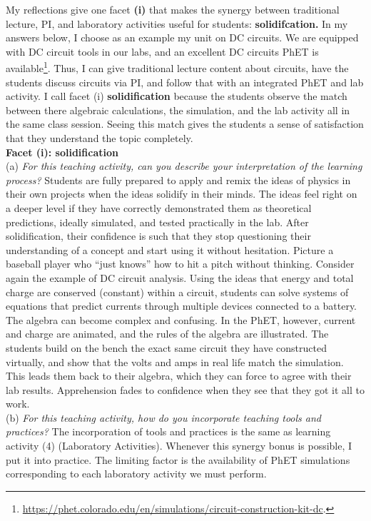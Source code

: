 \documentclass[../../../main.tex]{subfiles}
\begin{document}
My reflections give one facet \textbf{(i)} that makes the synergy between traditional lecture, PI, and laboratory activities useful for students: \textbf{solidifcation.}  In my answers below, I choose as an example my unit on DC circuits.  We are equipped with DC circuit tools in our labs, and an excellent DC circuits PhET is available\footnote{\url{https://phet.colorado.edu/en/simulations/circuit-construction-kit-dc}.}.  Thus, I can give traditional lecture content about circuits, have the students discuss circuits via PI, and follow that with an integrated PhET and lab activity.  I call facet (i) \textbf{solidification} because the students observe the match between there algebraic calculations, the simulation, and the lab activity all in the same class session.  Seeing this match gives the students a sense of satisfaction that they understand the topic completely.
\\
\vspace{0.25cm}
\textbf{Facet (i): solidification}
\\
\vspace{0.25cm}
(a) \textit{For this teaching activity, can you describe your interpretation of the learning process?}  Students are fully prepared to apply and remix the ideas of physics in their own projects when the ideas solidify in their minds.  The ideas feel right on a deeper level if they have correctly demonstrated them as theoretical predictions, ideally simulated, and tested practically in the lab.  After solidification, their confidence is such that they stop questioning their understanding of a concept and start using it without hesitation.  Picture a baseball player who ``just knows'' how to hit a pitch without thinking.  Consider again the example of DC circuit analysis.  Using the ideas that energy and total charge are conserved (constant) within a circuit, students can solve systems of equations that predict currents through multiple devices connected to a battery.  The algebra can become complex and confusing.  In the PhET, however, current and charge are animated, and the rules of the algebra are illustrated.  The students build on the bench the exact same circuit they have constructed virtually, and show that the volts and amps in real life match the simulation.  This leads them back to their algebra, which they can force to agree with their lab results.  Apprehension fades to confidence when they see that they got it all to work.
\\
\vspace{0.25cm}
(b) \textit{For this teaching activity, how do you incorporate teaching tools and practices?}  The incorporation of tools and practices is the same as learning activity (4) (Laboratory Activities).  Whenever this synergy bonus is possible, I put it into practice.  The limiting factor is the availability of PhET simulations corresponding to each laboratory activity we must perform.
\end{document}

